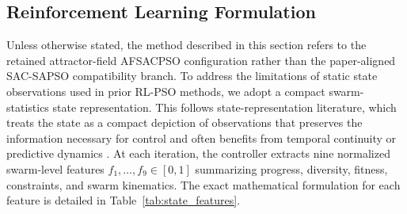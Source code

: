 \documentclass[final,5p,times]{elsarticle}
\begin{document}
\subsection{Reinforcement Learning Formulation}
Unless otherwise stated, the method described in this section refers to the retained attractor-field AFSACPSO configuration rather than the paper-aligned SAC-SAPSO compatibility branch.
To address the limitations of static state observations used in prior RL-PSO methods, we adopt a compact swarm-statistics state representation. This follows state-representation literature, which treats the state as a compact depiction of observations that preserves the information necessary for control and often benefits from temporal continuity or predictive dynamics \cite{Lesort2018State}.
At each iteration, the controller extracts nine normalized swarm-level features $f_1, \dots, f_9 \in [0,1]$ summarizing progress, diversity, fitness, constraints, and swarm kinematics. The exact mathematical formulation for each feature is detailed in Table~\ref{tab:state_features}.
\end{document}
